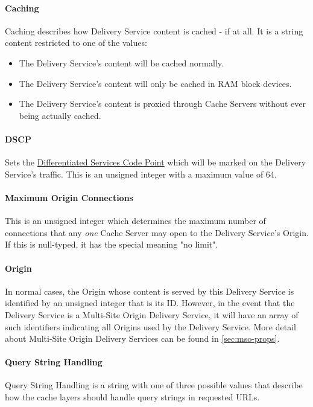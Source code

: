 \paragraph{Caching}
Caching describes how Delivery Service content is cached - if at all. It is a
string content restricted to one of the values:

\begin{itemize}
	\item {} The Delivery Service's content will be cached normally.
	\item {} The Delivery Service's content will only be cached
	in RAM block devices.
	\item {} The Delivery Service's content is proxied through
	Cache Servers without ever being actually cached.
\end{itemize}

\paragraph{DSCP}
Sets the
\href{https://tools.ietf.org/html/rfc2474}{Differentiated Services Code Point}
which will be marked on the Delivery Service's traffic. This is an unsigned
integer with a maximum value of 64.

\paragraph{Maximum Origin Connections}
This is an unsigned integer which determines the maximum number of connections
that any \emph{one} Cache Server may open to the Delivery Service's Origin.\\
If this is null-typed, it has the special meaning "no limit".

\paragraph{Origin}
In normal cases, the Origin whose content is served by this Delivery Service is
identified by an unsigned integer that is its ID. However, in the event that
the Delivery Service is a Multi-Site Origin Delivery Service, it will have an
array of such identifiers indicating all Origins used by the Delivery Service.
More detail about Multi-Site Origin Delivery Services can be found in
\ref{sec:mso-props}.

\paragraph{Query String Handling}
Query String Handling is a string with one of three possible values that
describe how the cache layers should handle query strings in requested URLs.

